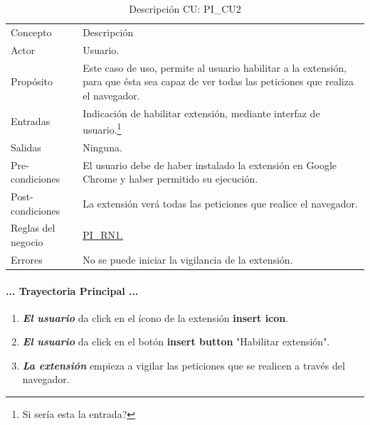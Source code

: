 \documentclass[12pt, a4paper, titlepage]{article}
\begin{document}
				\newpage
				\begin{table}[htb]
				\begin{center}
				\begin{tabular}{ |p{3.5cm}||p{9.5cm}|}
					\hline
					\rowcolor{guindapoli}
					\multicolumn{2}{|c|}{\textbf{\textcolor{white}{Caso de uso: PI\_CU2. Habilitar extensión.}}}\\
					\hline
					\rowcolor{azulfuerte}Concepto & Descripción\\
					\hline
					\cellcolor{azulclaro}Actor & 
					Usuario.\\ 
					\hline
					\cellcolor{azulclaro}Propósito &
					Este caso de uso, permite al usuario habilitar a la extensión, para que ésta sea capaz de ver todas las peticiones que realiza el navegador.\\
					\hline
					\cellcolor{azulclaro}Entradas &
					Indicación de habilitar extensión, mediante interfaz de usuario.\footnote{Si sería esta la entrada?}\\
					\hline
					\cellcolor{azulclaro}Salidas &
					Ninguna.\\
					\hline
					\cellcolor{azulclaro}Pre-condiciones&
					El usuario debe de haber instalado la extensión en Google Chrome y haber permitido su ejecución.\\
					\hline
					\cellcolor{azulclaro}Post-condiciones&
					La extensión verá todas las peticiones que realice el navegador.\\
					\hline
					\cellcolor{azulclaro}Reglas del negocio&
					\hyperref[PI_RN1]{PI\_RN1.}\\
					\hline
					\cellcolor{azulclaro}Errores &
					No se puede iniciar la vigilancia de la extensión.\\
					
					\hline
				\end{tabular}
				\caption[DCU: PI\_CU2]{Descripción CU: PI\_CU2}
				\end{center}
				\end{table}
				
				\paragraph{... Trayectoria Principal ...}
				\begin{enumerate}
					\item \textbf{\textit{El usuario}} da click en el ícono de la extensión \textbf{insert icon}.
					\item \textbf{\textit{El usuario}} da click en el botón \textbf{insert button} "Habilitar extensión".
					\item \textbf{\textit{La extensión}} empieza a vigilar las peticiones que se realicen a través del navegador.
				\end{enumerate}
\end{document}
